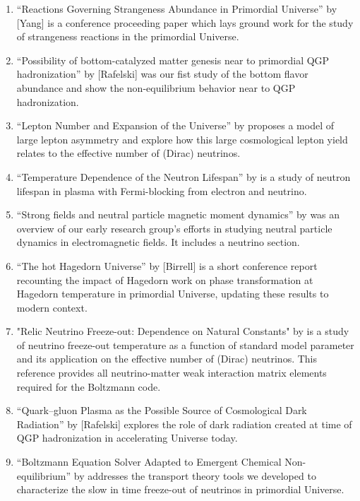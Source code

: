 \begin{enumerate}
%
\item ``Reactions Governing Strangeness Abundance in Primordial Universe'' by [Yang] is a conference proceeding paper which lays ground work for the study of strangeness reactions in the primordial Universe. 
%
\item ``Possibility of bottom-catalyzed matter genesis near to primordial QGP hadronization'' by [Rafelski] was our fist study of the bottom flavor abundance and show the non-equilibrium behavior near to QGP hadronization. 
%
\item ``Lepton Number and Expansion of the Universe'' by  proposes a model of large lepton asymmetry and explore how this large cosmological lepton yield relates to the effective number of (Dirac) neutrinos.
%
\item ``Temperature Dependence of the Neutron Lifespan'' by  is a study of neutron lifespan in plasma with Fermi-blocking from electron and neutrino. 
%
\item ``Strong fields and neutral particle magnetic moment dynamics'' by  was an overview of our early research group's efforts in studying neutral particle dynamics in electromagnetic fields. It includes a neutrino section. 
%
\item ``The hot Hagedorn Universe'' by [Birrell] is a short conference report recounting the impact of Hagedorn work on phase transformation at Hagedorn temperature in primordial Universe, updating these results to modern context.
%
\item "Relic Neutrino Freeze-out: Dependence on Natural Constants" by  is a study of neutrino freeze-out temperature as a function of standard model parameter and its application on the effective number of (Dirac) neutrinos. This reference provides all neutrino-matter weak interaction matrix elements required for the Boltzmann code. 
%
\item ``Quark–gluon Plasma as the Possible Source of Cosmological Dark Radiation'' by [Rafelski] explores the role of dark radiation created at time of QGP hadronization in accelerating Universe today.
%
\item ``Boltzmann Equation Solver Adapted to Emergent Chemical Non-equilibrium'' by  addresses the transport theory tools we developed to characterize the slow in time freeze-out of neutrinos in primordial Universe.

\end{enumerate}
